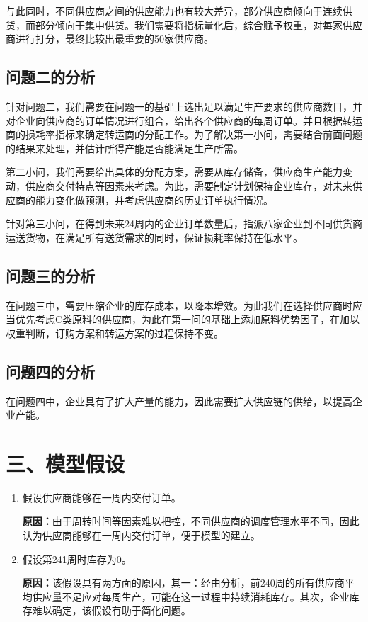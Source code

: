\documentclass{my_paper}
\begin{document}
与此同时，不同供应商之间的供应能力也有较大差异，部分供应商倾向于连续供货，而部分倾向于集中供货。我们需要将指标量化后，综合赋予权重，对每家供应商进行打分，最终比较出最重要的50家供应商。

\subsection{问题二的分析}

针对问题二，我们需要在问题一的基础上选出足以满足生产要求的供应商数目，并对企业向供应商的订单情况进行组合，给出各个供应商的每周订单。并且根据转运商的损耗率指标来确定转运商的分配工作。为了解决第一小问，需要结合前面问题的结果来处理，并估计所得产能是否能满足生产所需。

第二小问，我们需要给出具体的分配方案，需要从库存储备，供应商生产能力变动，供应商交付特点等因素来考虑。为此，需要制定计划保持企业库存，对未来供应商的能力变化做预测，并考虑供应商的历史订单执行情况。

针对第三小问，在得到未来24周内的企业订单数量后，指派八家企业到不同供货商运送货物，在满足所有送货需求的同时，保证损耗率保持在低水平。

\subsection{问题三的分析}

在问题三中，需要压缩企业的库存成本，以降本增效。为此我们在选择供应商时应当优先考虑C类原料的供应商，为此在第一问的基础上添加原料优势因子，在加以权重判断，订购方案和转运方案的过程保持不变。

\subsection{问题四的分析}

在问题四中，企业具有了扩大产量的能力，因此需要扩大供应链的供给，以提高企业产能。
\section{三、模型假设}
\begin{enumerate}
    \item 假设供应商能够在一周内交付订单。
    
    \textbf{原因：}由于周转时间等因素难以把控，不同供应商的调度管理水平不同，因此认为供应商能够在一周内交付订单，便于模型的建立。

    \item 假设第241周时库存为0。
    
    \textbf{原因：}该假设具有两方面的原因，其一：经由分析，前240周的所有供应商平均供应量不足应对每周生产，可能在这一过程中持续消耗库存。其次，企业库存难以确定，该假设有助于简化问题。
    
\end{enumerate}
\end{document}
